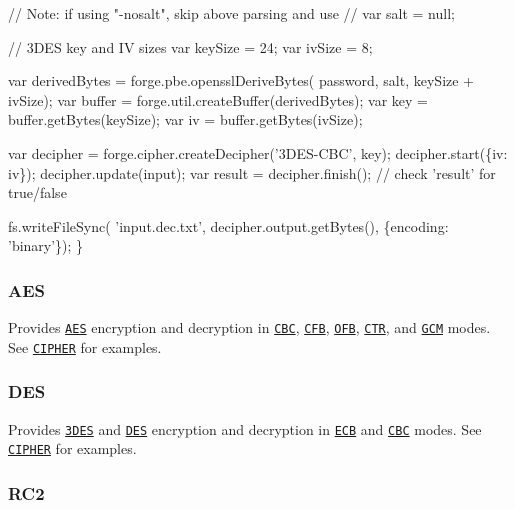 \begin{DoxyCode}
  // Note: if using "-nosalt", skip above parsing and use
  // var salt = null;

  // 3DES key and IV sizes
  var keySize = 24;
  var ivSize = 8;

  var derivedBytes = forge.pbe.opensslDeriveBytes(
    password, salt, keySize + ivSize);
  var buffer = forge.util.createBuffer(derivedBytes);
  var key = buffer.getBytes(keySize);
  var iv = buffer.getBytes(ivSize);

  var decipher = forge.cipher.createDecipher('3DES-CBC', key);
  decipher.start(\{iv: iv\});
  decipher.update(input);
  var result = decipher.finish(); // check 'result' for true/false

  fs.writeFileSync(
    'input.dec.txt', decipher.output.getBytes(), \{encoding: 'binary'\});
\}
\end{DoxyCode}


\label{_aes}%
 \subsubsection*{A\+ES}

Provides \href{http://en.wikipedia.org/wiki/Advanced_Encryption_Standard}{\tt A\+ES} encryption and decryption in \href{http://en.wikipedia.org/wiki/Block_cipher_mode_of_operation}{\tt C\+BC}, \href{http://en.wikipedia.org/wiki/Block_cipher_mode_of_operation}{\tt C\+FB}, \href{http://en.wikipedia.org/wiki/Block_cipher_mode_of_operation}{\tt O\+FB}, \href{http://en.wikipedia.org/wiki/Block_cipher_mode_of_operation}{\tt C\+TR}, and \href{http://en.wikipedia.org/wiki/GCM_mode}{\tt G\+CM} modes. See \href{#cipher}{\tt C\+I\+P\+H\+ER} for examples.

\label{_des}%
 \subsubsection*{D\+ES}

Provides \href{http://en.wikipedia.org/wiki/Triple_DES}{\tt 3\+D\+ES} and \href{http://en.wikipedia.org/wiki/Data_Encryption_Standard}{\tt D\+ES} encryption and decryption in \href{http://en.wikipedia.org/wiki/Block_cipher_mode_of_operation}{\tt E\+CB} and \href{http://en.wikipedia.org/wiki/Block_cipher_mode_of_operation}{\tt C\+BC} modes. See \href{#cipher}{\tt C\+I\+P\+H\+ER} for examples.

\label{_rc2}%
 \subsubsection*{R\+C2}

